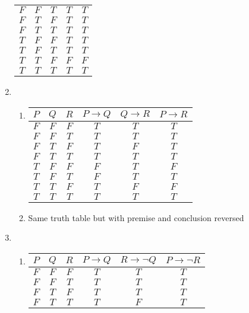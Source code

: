 \begin{enumerate}
\begin{tabular}{c|c|c|c|c}
        $F$ & $F$ & $T$ & $T$ & $T$ \\
        $F$ & $T$ & $F$ & $T$ & $T$ \\
        $F$ & $T$ & $T$ & $T$ & $T$ \\
        $T$ & $F$ & $F$ & $T$ & $T$ \\
        $T$ & $F$ & $T$ & $T$ & $T$ \\
        $T$ & $T$ & $F$ & $F$ & $F$ \\
        $T$ & $T$ & $T$ & $T$ & $T$ \\
    \end{tabular}
    \item 
    \begin{enumerate}
        \item 
        \begin{tabular}{c|c|c|c|c|c}
        $P$ & $Q$ & $R$ & $P \rightarrow Q$ & $Q \rightarrow R$ & $P \rightarrow R$ \\ \hline
        $F$ & $F$ & $F$ & $T$ & $T$ & $T$ \\
        $F$ & $F$ & $T$ & $T$ & $T$ & $T$ \\
        $F$ & $T$ & $F$ & $T$ & $F$ & $T$ \\
        $F$ & $T$ & $T$ & $T$ & $T$ & $T$ \\
        $T$ & $F$ & $F$ & $F$ & $T$ & $F$ \\
        $T$ & $F$ & $T$ & $F$ & $T$ & $T$ \\
        $T$ & $T$ & $F$ & $T$ & $F$ & $F$ \\
        $T$ & $T$ & $T$ & $T$ & $T$ & $T$ \\
        \end{tabular}
        \item 
        Same truth table but with premise and conclusion reversed
    \end{enumerate}
    \item 
    \begin{enumerate}
        \item 
        \begin{tabular}{c|c|c|c|c|c}
        $P$ & $Q$ & $R$ & $P \rightarrow Q$ & $R \rightarrow \lnot Q$ & $P \rightarrow \lnot R$ \\ \hline
        $F$ & $F$ & $F$ & $T$ & $T$ & $T$ \\
        $F$ & $F$ & $T$ & $T$ & $T$ & $T$ \\
        $F$ & $T$ & $F$ & $T$ & $T$ & $T$ \\
        $F$ & $T$ & $T$ & $T$ & $F$ & $T$ \\

\end{tabular}
\end{enumerate}
\end{enumerate}
